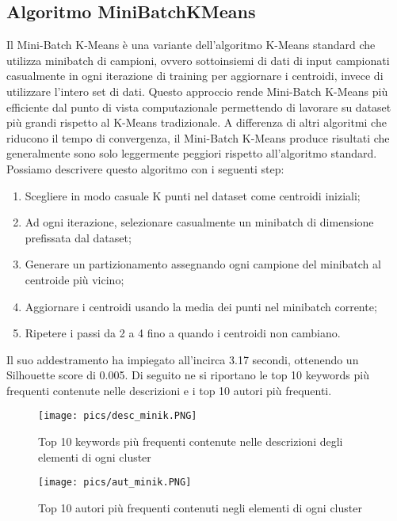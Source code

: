 \documentclass[12pt,oneside]{article}
\begin{document}
    \begin{enumerate}
    \subsection{Algoritmo MiniBatchKMeans}
    \begin{justify}
    Il Mini-Batch K-Means è una variante dell'algoritmo K-Means standard che utilizza minibatch di campioni, ovvero sottoinsiemi di dati di input campionati casualmente in ogni iterazione di training per aggiornare i centroidi, invece di utilizzare l'intero set di dati. Questo approccio rende Mini-Batch K-Means più efficiente dal punto di vista computazionale permettendo di lavorare su dataset più grandi rispetto al K-Means tradizionale. A differenza di altri algoritmi che riducono il tempo di convergenza, il Mini-Batch K-Means produce risultati che generalmente sono solo leggermente peggiori rispetto all’algoritmo standard. 
    Possiamo descrivere questo algoritmo con i seguenti step:

    \begin{enumerate}[label=\arabic*)]
        \item Scegliere in modo casuale K punti nel dataset come centroidi iniziali;
        \item Ad ogni iterazione, selezionare casualmente un minibatch di dimensione prefissata dal dataset;
        \item Generare un partizionamento assegnando ogni campione del minibatch al centroide più vicino; 
        \item Aggiornare i centroidi usando la media dei punti nel minibatch corrente;
        \item Ripetere i passi da 2 a 4 fino a quando i centroidi non cambiano.
    \end{enumerate}
    Il suo addestramento ha impiegato all’incirca 3.17 secondi, ottenendo un Silhouette score di 0.005. Di seguito ne si riportano le top 10 keywords più frequenti contenute nelle descrizioni e i top 10 autori più frequenti.
    \end{justify}
    \hfill

    \begin{figure}[H]
    \texttt{[image: pics/desc\_minik.PNG]}
    \captionsetup{width=0.90\textwidth, justification=centering}
    \caption{Top 10 keywords più frequenti contenute nelle descrizioni degli elementi di ogni cluster}
    \end{figure}

    \begin{figure}[H]
    \texttt{[image: pics/aut\_minik.PNG]}
    \captionsetup{width=0.90\textwidth, justification=centering}
    \caption{Top 10 autori più frequenti contenuti negli elementi di ogni cluster}
    \end{figure}


\end{enumerate}
\end{document}
